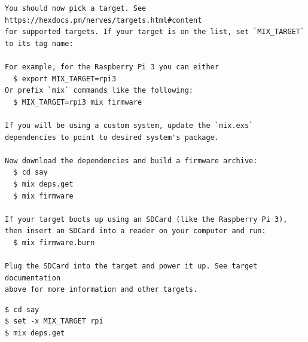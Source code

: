 \documentclass[10pt,xcolor=pdflatex,dvipsnames,table]{beamer}
\begin{document}
\begin{frame}[fragile]
\begin{overprint}
\begin{verbatim}
You should now pick a target. See
https://hexdocs.pm/nerves/targets.html#content
for supported targets. If your target is on the list, set `MIX_TARGET`
to its tag name:

For example, for the Raspberry Pi 3 you can either
  $ export MIX_TARGET=rpi3
Or prefix `mix` commands like the following:
  $ MIX_TARGET=rpi3 mix firmware

If you will be using a custom system, update the `mix.exs`
dependencies to point to desired system's package.

Now download the dependencies and build a firmware archive:
  $ cd say
  $ mix deps.get
  $ mix firmware

If your target boots up using an SDCard (like the Raspberry Pi 3),
then insert an SDCard into a reader on your computer and run:
  $ mix firmware.burn

Plug the SDCard into the target and power it up. See target documentation
above for more information and other targets.
\end{verbatim}

\begin{example}
\begin{verbatim}
$ cd say
$ set -x MIX_TARGET rpi
$ mix deps.get
\end{verbatim}
\end{example}
\end{overprint}
\end{frame}
\end{document}
